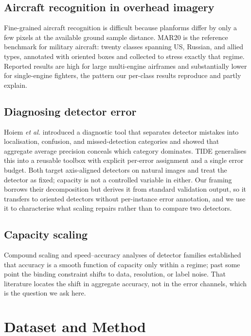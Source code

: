 \documentclass[conference]{IEEEtran}
\begin{document}
\subsection{Aircraft recognition in overhead imagery}
Fine-grained aircraft recognition is difficult because planforms differ by only a
few pixels at the available ground sample distance. MAR20 \cite{yu2021mar20} is
the reference benchmark for military aircraft: twenty classes spanning US,
Russian, and allied types, annotated with oriented boxes and collected to stress
exactly that regime. Reported results are high for large multi-engine airframes
and substantially lower for single-engine fighters, the pattern our per-class
results reproduce and partly explain.

\subsection{Diagnosing detector error}
Hoiem \emph{et al.} \cite{hoiem2012} introduced a diagnostic tool that separates
detector mistakes into localisation, confusion, and missed-detection categories
and showed that aggregate average precision conceals which category dominates.
TIDE \cite{bolya2020} generalises this into a reusable toolbox with explicit
per-error assignment and a single error budget. Both target axis-aligned
detectors on natural images and treat the detector as fixed; capacity is not a
controlled variable in either. Our framing borrows their decomposition but
derives it from standard validation output, so it transfers to oriented
detectors without per-instance error annotation, and we use it to characterise
what scaling repairs rather than to compare two detectors.

\subsection{Capacity scaling}
Compound scaling \cite{tan2019efficientnet} and speed--accuracy analyses of
detector families \cite{huang2017speed} established that accuracy is a smooth
function of capacity only within a regime; past some point the binding
constraint shifts to data, resolution, or label noise. That literature locates
the shift in aggregate accuracy, not in the error channels, which is the
question we ask here.

\section{Dataset and Method}
\label{sec:method}
\end{document}

